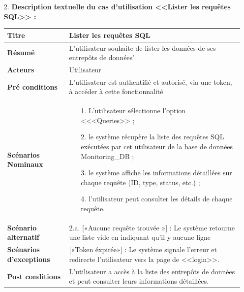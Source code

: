 \begin{enumerate}
\begin{table}[H]
            \caption{description textuelle de cas d'utilisation <<Lister les entrepôts de données>>}
        \end{table}
        \newpage
        \vspace{2cm}
        \item[2.] \textbf{Description textuelle du cas d'utilisation <<Lister les requêtes SQL>> :}
    \begin{table}[H]
        \centering
            \begin{tabular}{|p{3.5cm}|p{12cm}|}
                \hline \textbf{Titre} &  Lister les requêtes SQL \\
                \hline \textbf{Résumé} & L'utilisateur souhaite de lister les données de ses entrepôts de données' \\
                \hline \textbf{Acteurs} & Utilisateur \\
                \hline \textbf{Pré conditions }& L'utilisateur est authentifié et autorisé, via une token, à accéder à cette fonctionnalité\\
                \hline \textbf{Scénarios Nominaux} &
                    \begin{enumerate}
                        \item [1.] L'utilisateur sélectionne l'option <<<Queries>> ;
                        \item [2.] le système récupère la liste des requêtes SQL exécutées par cet utilisateur de la base de données Monitoring\_DB ;
                        \item [3.] le système affiche les informations détaillées sur chaque requête (ID, type, status, etc.) ;
                        \item [4.] l'utilisateur peut consulter les détails de chaque requête.      
                    \end{enumerate}\\
                        \hline \textbf{Scénario alternatif} & 
                            2.a. \hspace{0.3cm} [«Aucune requête trouvée »] : Le système retourne une liste vide en indiquant qu'il y aucune ligne\\
                \hline  \textbf{Scénarios d'exceptions} & 
                  [«Token éxpirée»] : Le système signale l'erreur et redirecte l'utilisateur vers la page de <<login>>.\\
                \hline \textbf{Post conditions} & L'utilisateur a accès à la liste des entrepôts de données et peut consulter leurs informations détaillées.\\

\end{tabular}
\end{table}
\end{enumerate}
